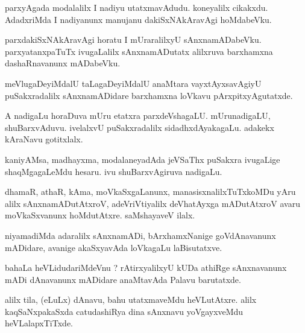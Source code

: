 \documentclass{article}
\begin{document}
\begin{mn}
parxyAgada  modalalilx  I  nadiyu  utatxmavAdudu.  koneyalilx  cikakxdu.  
AdadxriMda  I  nadiyanunx  manujanu  dakiSxNAkAravAgi  hoMdabeVku.
\end{mn}

\begin{mn}
parxdakiSxNAkAravAgi  horatu  I  mUraralilxyU  sAnxnamADabeVku.  parxyatanxpaTuTx  
ivugaLalilx  sAnxnamADutatx  alilxruva  barxhamxna  dashaRnavanunx  mADabeVku.
\end{mn}

\begin{mn}
meVlugaDeyiMdalU  taLagaDeyiMdalU  anaMtara  vayxtAyxsavAgiyU  puSakxradalilx  
sAnxnamADidare  barxhamxna  loVkavu  pArxpitxyAgutatxde.
\end{mn}

\begin{mn}
A nadigaLu  horaDuva  mUru  etatxra  parxdeVshagaLU.  mUrunadigaLU,  shuBarxvAduvu.  
ivelalxvU  puSakxradalilx  sidadhxdAyakagaLu.  adakekx  kAraNavu  gotitxlalx.
\end{mn}

\begin{mn}
kaniyAMsa,  madhayxma,  modalaneyadAda  jeVSaThx puSakxra  ivugaLige  shaqMgagaLeMdu  
hesaru.  ivu  shuBarxvAgiruva  nadigaLu.
\end{mn}

\begin{mn}
dhamaR,  athaR,  kAma,  moVkaSxgaLanunx,  manasisxnalilxTuTxkoMDu  yAru alilx  sAnxnamADutAtxroV,  
adeVriVtiyalilx  deVhatAyxga mADutAtxroV  avaru  moVkaSxvanunx  hoMdutAtxre.  saMshayaveV ilalx.
\end{mn}

\begin{mn}
niyamadiMda  adaralilx  sAnxnamADi,  bArxhamxNanige  goVdAnavanunx  mADidare,  
avanige  akaSxyavAda  loVkagaLu  laBisutatxve.
\end{mn}

\begin{mn}
bahaLa  heVLidudariMdeVnu ?  rAtirxyalilxyU  kUDa  athiRge sAnxnavanunx  mADi 
dAnavanunx  mADidare  anaMtavAda  Palavu  barutatxde. 
\end{mn}

\begin{mn}
alilx  tila, (eLuLx) dAnavu,  bahu  utatxmaveMdu  heVLutAtxre.  alilx  kaqSaNxpakaSxda  
catudashiRya  dina  sAnxnavu  yoVgayxveMdu  heVLalapxTiTxde.
\end{mn}
\end{document}
